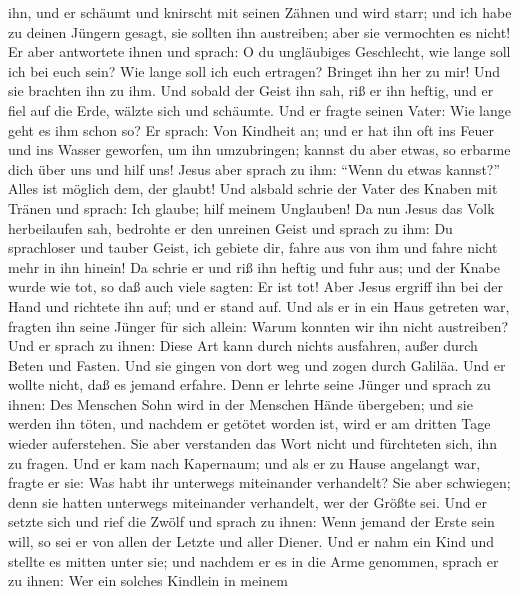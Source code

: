 ihn, und er schäumt und knirscht mit seinen Zähnen und wird starr; und
ich habe zu deinen Jüngern gesagt, sie sollten ihn austreiben; aber sie
vermochten es nicht!  Er aber antwortete ihnen und
sprach: O du ungläubiges Geschlecht, wie lange soll ich bei euch sein?
Wie lange soll ich euch ertragen? Bringet ihn her zu mir!
 Und sie brachten ihn zu ihm. Und sobald der Geist ihn
sah, riß er ihn heftig, und er fiel auf die Erde, wälzte sich und
schäumte.  Und er fragte seinen Vater: Wie lange geht es
ihm schon so? Er sprach: Von Kindheit an;  und er hat ihn
oft ins Feuer und ins Wasser geworfen, um ihn umzubringen; kannst du
aber etwas, so erbarme dich über uns und hilf uns!  Jesus
aber sprach zu ihm: ``Wenn du etwas kannst?'' Alles ist möglich dem, der
glaubt!  Und alsbald schrie der Vater des Knaben mit
Tränen und sprach: Ich glaube; hilf meinem Unglauben!  Da
nun Jesus das Volk herbeilaufen sah, bedrohte er den unreinen Geist und
sprach zu ihm: Du sprachloser und tauber Geist, ich gebiete dir, fahre
aus von ihm und fahre nicht mehr in ihn hinein!  Da
schrie er und riß ihn heftig und fuhr aus; und der Knabe wurde wie tot,
so daß auch viele sagten: Er ist tot!  Aber Jesus ergriff
ihn bei der Hand und richtete ihn auf; und er stand auf. 
Und als er in ein Haus getreten war, fragten ihn seine Jünger für sich
allein: Warum konnten wir ihn nicht austreiben?  Und er
sprach zu ihnen: Diese Art kann durch nichts ausfahren, außer durch
Beten und Fasten.  Und sie gingen von dort weg und zogen
durch Galiläa. Und er wollte nicht, daß es jemand erfahre.
 Denn er lehrte seine Jünger und sprach zu ihnen: Des
Menschen Sohn wird in der Menschen Hände übergeben; und sie werden ihn
töten, und nachdem er getötet worden ist, wird er am dritten Tage wieder
auferstehen.  Sie aber verstanden das Wort nicht und
fürchteten sich, ihn zu fragen.  Und er kam nach
Kapernaum; und als er zu Hause angelangt war, fragte er sie: Was habt
ihr unterwegs miteinander verhandelt?  Sie aber
schwiegen; denn sie hatten unterwegs miteinander verhandelt, wer der
Größte sei.  Und er setzte sich und rief die Zwölf und
sprach zu ihnen: Wenn jemand der Erste sein will, so sei er von allen
der Letzte und aller Diener.  Und er nahm ein Kind und
stellte es mitten unter sie; und nachdem er es in die Arme genommen,
sprach er zu ihnen:  Wer ein solches Kindlein in meinem
